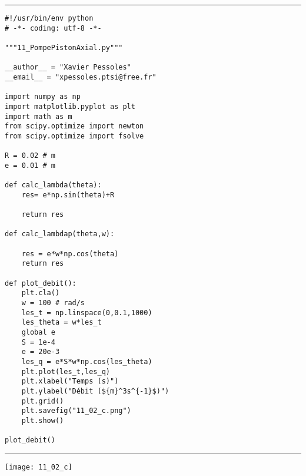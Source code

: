 \ifprof

\noindent\hrule
\begin{lstlisting}
#!/usr/bin/env python
# -*- coding: utf-8 -*-

"""11_PompePistonAxial.py"""

__author__ = "Xavier Pessoles"
__email__ = "xpessoles.ptsi@free.fr"

import numpy as np
import matplotlib.pyplot as plt
import math as m
from scipy.optimize import newton
from scipy.optimize import fsolve

R = 0.02 # m
e = 0.01 # m

def calc_lambda(theta):
    res= e*np.sin(theta)+R
    
    return res

def calc_lambdap(theta,w):
   
    res = e*w*np.cos(theta)
    return res

def plot_debit():
    plt.cla()
    w = 100 # rad/s 
    les_t = np.linspace(0,0.1,1000)
    les_theta = w*les_t
    global e 
    S = 1e-4
    e = 20e-3
    les_q = e*S*w*np.cos(les_theta)
    plt.plot(les_t,les_q)
    plt.xlabel("Temps (s)")
    plt.ylabel("Débit (${m}^3s^{-1}$)")
    plt.grid()
    plt.savefig("11_02_c.png")
    plt.show()
    
plot_debit()
\end{lstlisting}
\noindent\hrule

\begin{marginfigure}
\texttt{[image: 11\_02\_c]}
\end{marginfigure}

\else
\fi

\ifprof
\else
\footnotesize
\ifcolle
\else
{}
\fi
\normalsize


\fi